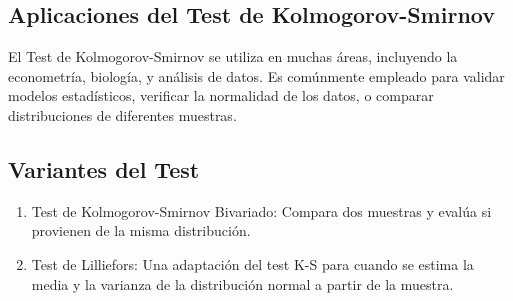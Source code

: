 \documentclass[
  us-letterpaper,
]{scrreprt}
\theoremstyle{plain}
\theoremstyle{plain}
\theoremstyle{definition}
\theoremstyle{remark}
\begin{document}
\subsection{Aplicaciones del Test de
Kolmogorov-Smirnov}\label{aplicaciones-del-test-de-kolmogorov-smirnov}

El Test de Kolmogorov-Smirnov se utiliza en muchas áreas, incluyendo la
econometría, biología, y análisis de datos. Es comúnmente empleado para
validar modelos estadísticos, verificar la normalidad de los datos, o
comparar distribuciones de diferentes muestras.

\subsection{Variantes del Test}\label{variantes-del-test}

\begin{enumerate}
\def\labelenumi{\arabic{enumi}.}
\item
  Test de Kolmogorov-Smirnov Bivariado: Compara dos muestras y evalúa si
  provienen de la misma distribución.
\item
  Test de Lilliefors: Una adaptación del test K-S para cuando se estima
  la media y la varianza de la distribución normal a partir de la
  muestra.
\end{enumerate}
\end{document}
